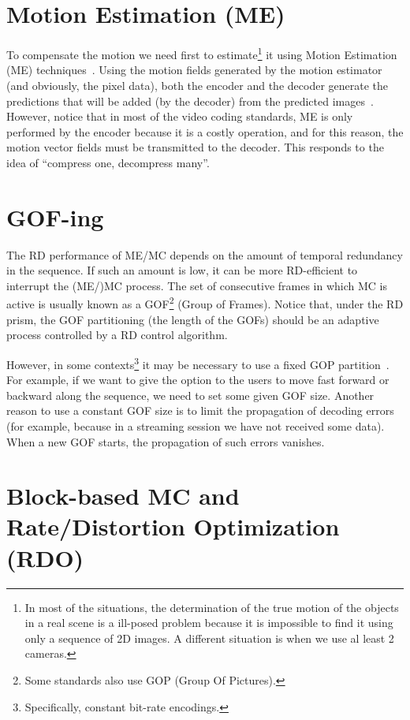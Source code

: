 
\section{Motion Estimation (ME)}

To compensate the motion we need first to estimate\footnote{In most of
the situations, the determination of the true motion of the objects in
a real scene is a ill-posed problem because it is impossible to find
it using only a sequence of 2D images. A different situation is when
we use al least 2 cameras.} it using Motion Estimation (ME)
techniques~\cite{vruiz__ME}. Using the motion fields generated by the
motion estimator (and obviously, the pixel data), both the encoder
and the decoder generate the predictions that will be added (by the
decoder) from the predicted images~\cite{vruiz__MC}. However, notice
that in most of the video coding standards, ME is only performed by
the encoder because it is a costly operation, and for this reason, the
motion vector fields must be transmitted to the decoder. This responds
to the idea of ``compress one, decompress many''.


\section{GOF-ing}

The RD performance of ME/MC depends on the amount of temporal
redundancy in the sequence. If such an amount is low, it can be more
RD-efficient to interrupt the (ME/)MC process. The set of consecutive
frames in which MC is active is usually known as a GOF\footnote{Some
standards also use GOP (Group Of Pictures).} (Group of Frames). Notice
that, under the RD prism, the GOF partitioning (the length of the
GOFs) should be an adaptive process controlled by a RD control
algorithm.

However, in some contexts\footnote{Specifically, constant bit-rate
  encodings.} it may be necessary to use a fixed GOP
partition~\cite{vruiz__MC}. For example, if we want to give the option
to the users to move fast forward or backward along the sequence, we
need to set some given GOF size. Another reason to use a constant GOF
size is to limit the propagation of decoding errors (for example,
because in a streaming session we have not received some data). When a
new GOF starts, the propagation of such errors vanishes.

\section{Block-based MC and Rate/Distortion Optimization (RDO)}

